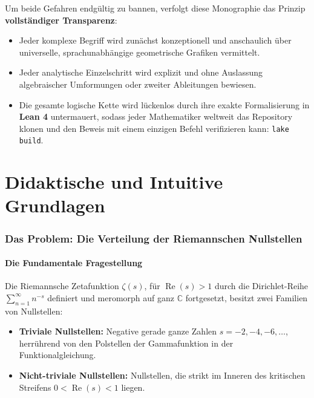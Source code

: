 \documentclass[11pt,a4paper]{article}
\theoremstyle{definition}
\theoremstyle{remark}
\begin{document}
Um beide Gefahren endgültig zu bannen, verfolgt diese Monographie das Prinzip \textbf{vollständiger Transparenz}:
\begin{itemize}
    \item Jeder komplexe Begriff wird zunächst konzeptionell und anschaulich über universelle, sprachunabhängige geometrische Grafiken vermittelt.
    \item Jeder analytische Einzelschritt wird explizit und ohne Auslassung algebraischer Umformungen oder zweiter Ableitungen bewiesen.
    \item Die gesamte logische Kette wird lückenlos durch ihre exakte Formalisierung in \textbf{Lean 4} untermauert, sodass jeder Mathematiker weltweit das Repository klonen und den Beweis mit einem einzigen Befehl verifizieren kann: \texttt{lake build}.
\end{itemize}

\newpage

\part{Didaktische und Intuitive Grundlagen}

\section{Das Problem: Die Verteilung der Riemannschen Nullstellen}

\subsection{Die Fundamentale Fragestellung}
Die Riemannsche Zetafunktion $\zeta(s)$, für $\operatorname{Re}(s) > 1$ durch die Dirichlet-Reihe $\sum_{n=1}^\infty n^{-s}$ definiert und meromorph auf ganz $\mathbb{C}$ fortgesetzt, besitzt zwei Familien von Nullstellen:
\begin{itemize}
    \item \textbf{Triviale Nullstellen:} Negative gerade ganze Zahlen $s = -2, -4, -6, \dots$, herrührend von den Polstellen der Gammafunktion in der Funktionalgleichung.
    \item \textbf{Nicht-triviale Nullstellen:} Nullstellen, die strikt im Inneren des kritischen Streifens $0 < \operatorname{Re}(s) < 1$ liegen.
\end{itemize}
\end{document}
